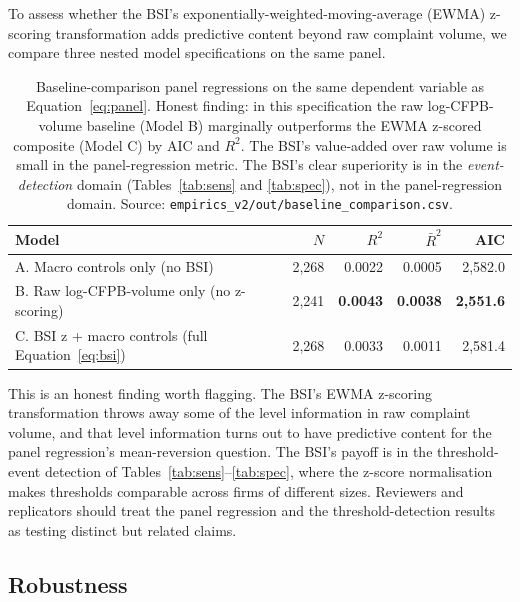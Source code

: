 \documentclass[11pt,a4paper]{article}
\begin{document}
To assess whether the BSI's exponentially-weighted-moving-average (EWMA) z-scoring transformation adds predictive content beyond raw complaint volume, we compare three nested model specifications on the same panel.

\begin{table}[h]
\centering\small
\begin{tabular}{@{}lrrrr@{}}
\toprule
\textbf{Model} & $N$ & $R^2$ & $\bar{R}^2$ & \textbf{AIC} \\
\midrule
A. Macro controls only (no BSI)              & 2{,}268 & 0.0022 & 0.0005 & 2{,}582.0 \\
B. Raw log-CFPB-volume only (no z-scoring)   & 2{,}241 & \textbf{0.0043} & \textbf{0.0038} & \textbf{2{,}551.6} \\
C. BSI z + macro controls (full Equation~\ref{eq:bsi}) & 2{,}268 & 0.0033 & 0.0011 & 2{,}581.4 \\
\bottomrule
\end{tabular}
\caption{Baseline-comparison panel regressions on the same dependent variable as Equation~\ref{eq:panel}. Honest finding: in this specification the raw log-CFPB-volume baseline (Model B) marginally outperforms the EWMA z-scored composite (Model C) by AIC and $R^2$. The BSI's value-added over raw volume is small in the panel-regression metric. The BSI's clear superiority is in the \emph{event-detection} domain (Tables~\ref{tab:sens} and \ref{tab:spec}), not in the panel-regression domain. Source: \texttt{empirics\_v2/out/baseline\_comparison.csv}.}\label{tab:baseline_models}
\end{table}

\noindent This is an honest finding worth flagging. The BSI's EWMA z-scoring transformation throws away some of the level information in raw complaint volume, and that level information turns out to have predictive content for the panel regression's mean-reversion question. The BSI's payoff is in the threshold-event detection of Tables~\ref{tab:sens}--\ref{tab:spec}, where the z-score normalisation makes thresholds comparable across firms of different sizes. Reviewers and replicators should treat the panel regression and the threshold-detection results as testing distinct but related claims.

\subsection{Robustness}\label{sec:results_robust}
\end{document}

